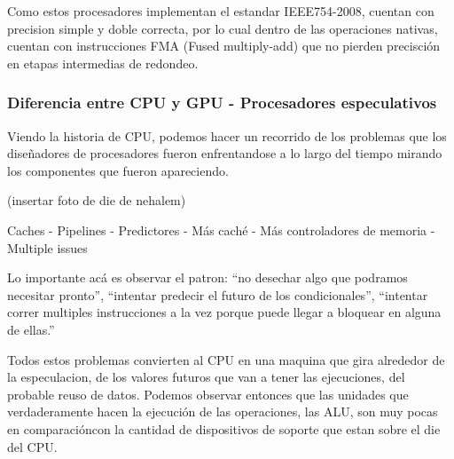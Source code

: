 Como estos procesadores implementan el estandar IEEE754-2008, cuentan con precision simple y
doble correcta, por lo cual dentro de las operaciones nativas, cuentan con instrucciones FMA
(Fused multiply-add) que no pierden precisci\'on en etapas intermedias de redondeo.


\subsubsection{Diferencia entre CPU y GPU - Procesadores especulativos}
Viendo la historia de CPU, podemos hacer un recorrido de los problemas que los dise\~nadores de procesadores
fueron enfrentandose a lo largo del tiempo mirando los componentes que fueron apareciendo.

(insertar foto de die de nehalem)

Caches - Pipelines - Predictores - M\'as cach\'e - M\'as controladores de memoria - Multiple issues

Lo importante ac\'a es observar el patron: ``no desechar algo que podramos necesitar pronto'',
``intentar predecir el futuro de los condicionales'', ``intentar correr multiples instrucciones a la vez
porque puede llegar a bloquear en alguna de ellas.''

Todos estos problemas convierten al CPU en una maquina que gira alrededor de la especulacion,
de los valores futuros que van a tener las ejecuciones, del probable reuso de datos.
Podemos observar entonces que las unidades que verdaderamente hacen la ejecuci\'on de las operaciones,
las ALU, son muy pocas en comparaci\'oncon la cantidad de dispositivos de soporte que estan
sobre el die del CPU.

